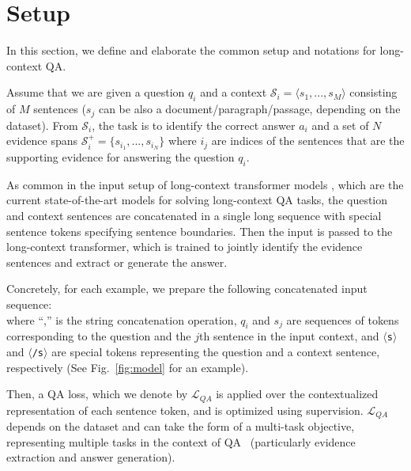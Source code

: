 \section{Setup}
\label{sec:background}
In this section, we define and elaborate the common setup and notations for long-context QA.

Assume that we are given a question $q_i$ and a context $\mathcal{S}_i{=}\langle {s_1},...,{s_M}\rangle$ consisting of $M$ sentences ($s_j$ can be also a document/paragraph/passage, depending on the dataset). From $\mathcal{S}_i$, the task is to identify the correct answer $a_i$ and a set of $N$ evidence spans $\mathcal{S}^+_i{=}\{s_{i_1},..., s_{i_N}\}$ where $i_j$ are indices of the sentences that are the supporting evidence for answering the question $q_i$. %

As common in the input setup of long-context transformer models \cite{longformer,zaheer2020big,caciularu-etal-2021-cdlm-cross}, which are the current state-of-the-art models for solving long-context QA tasks, 
the question and context sentences are concatenated in a single long sequence with special sentence tokens specifying sentence boundaries. 
Then the input is passed to the long-context transformer, which is trained to jointly identify the evidence sentences and extract or generate the answer.

Concretely, for each example, we prepare the following concatenated input sequence:
\begin{equation*}
[\texttt{$\langle$s$\rangle$},q_i,\texttt{$\langle$/s$\rangle$},s_{1},\texttt{$\langle$/s$\rangle$},s_{2},...,\texttt{$\langle$/s$\rangle$},s_{M}]
\label{eq:input}
\end{equation*}
where ``,'' is the string concatenation operation, $q_i$ and $s_j$ are sequences of tokens corresponding to the question and the $j$th sentence in the input context, and \texttt{$\langle$s$\rangle$} and \texttt{$\langle$/s$\rangle$} are special tokens representing the question and a context sentence, respectively (See Fig.~\ref{fig:model} for an example). %

Then, a QA loss, which we denote by $\mathcal{L}_{QA}$ is applied over the contextualized representation of each sentence token, and is optimized using supervision.  $\mathcal{L}_{QA}$ depends on the dataset and can take the form of a multi-task objective, representing multiple tasks in the context of QA~\cite{dasigi-etal-2021-dataset} (particularly evidence extraction and answer generation). 



